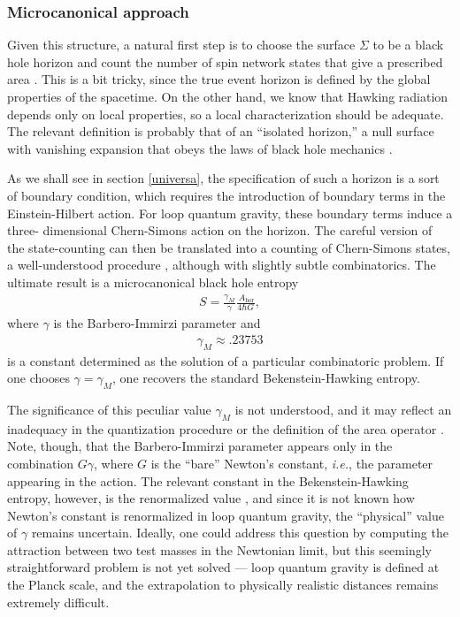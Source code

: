 \documentclass[11pt]{article}
\begin{document}
\subsubsection{Microcanonical approach}

Given this structure, a natural first step is to choose the surface
$\Sigma$ to be a black hole horizon and count the number of spin 
network states that give a prescribed area \cite{Krasnov,Rovellib}.   
This is a bit tricky, since the true event horizon  is 
defined by the global properties of the spacetime.  On the other hand, 
we know that Hawking radiation depends only on local
properties, so a local characterization
should be adequate.  The relevant definition is probably that of an
``isolated horizon,'' a null surface with vanishing expansion that
obeys the laws of black hole mechanics \cite{Ashisol,Ashisolb}.

As we shall see in section \ref{universa}, the specification
of such a horizon is a sort of boundary condition, which requires 
the introduction of boundary terms in the Einstein-Hilbert action.
For loop quantum gravity, these boundary terms induce a three-%
dimensional Chern-Simons action on the horizon.  The careful 
version of the state-counting \cite{ABCK,ABK} can then be
translated into a counting of Chern-Simons states, a well-understood
procedure \cite{Witten_Jones}, although with slightly subtle 
combinatorics.  The ultimate result is a microcanonical  black hole 
entropy \cite{Domagala,Meissner}
\begin{align}
S = \frac{\gamma_M}{\gamma}
  \frac{\ A_{\mathrm{\scriptstyle hor}}}{4\hbar G} ,
\label{Carlipg6}
\end{align}
where $\gamma$ is the Barbero-Immirzi parameter and
\begin{align}
\gamma_M \approx .23753
\label{Carlipg7}
\end{align}
is a constant determined as the solution of a particular
combinatoric problem.  If one chooses $\gamma=\gamma_M$, 
one recovers the standard Bekenstein-Hawking entropy.  

The significance of this peculiar value $\gamma_M$ is not 
understood, and it may reflect an inadequacy in the quantization 
procedure or the definition of the area operator \cite{Alexandrov}.  
Note, though, that the Barbero-Immirzi parameter appears only
in the combination $G\gamma$, where $G$ is the ``bare''
Newton's constant, \emph{i.e.}, the parameter appearing in the action.
The relevant constant in the Bekenstein-Hawking entropy, however,
is the renormalized value \cite{Jacobsone}, and since it is not known
how Newton's constant is renormalized in loop quantum gravity,
the ``physical'' value of $\gamma$ remains uncertain.
Ideally, one could address this question by computing the attraction
between two test masses in the Newtonian limit, but this seemingly
straightforward problem is not yet solved --- loop quantum gravity
is defined at the Planck scale, and the extrapolation to
physically realistic distances remains extremely difficult.
\end{document}
